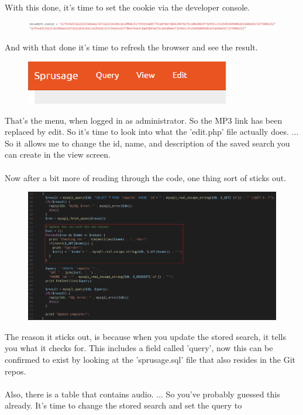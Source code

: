 \documentclass[writeup.tex]{subfiles}
\begin{document}
			With this done, it's time to set the cookie via the developer console.
			
			\begin{figure}[H]
				\centering
				\includegraphics[width=\linewidth]{"screenshots/pwns/Site 7 - cookie"}
			\end{figure}
			
			And with that done it's time to refresh the browser and see the result.
			
			\begin{figure}[H]
				\centering
				\includegraphics[scale=1]{"screenshots/pwns/Site 7 - admin menu"}
			\end{figure}
			
			That's the menu, when logged in as administrator. So the MP3 link has been replaced by edit. So it's time to look into what the 'edit.php' file actually does. ... So it allows me to change the id, name, and description of the saved search you can create in the view screen.\\
			\\
			Now after a bit more of reading through the code, one thing sort of sticks out.
			
			\begin{figure}[H]
				\centering
				\includegraphics[width=\linewidth]{"screenshots/pwns/Site 7 - sql edit"}
			\end{figure}
			
			The reason it sticks out, is because when you update the stored search, it tells you what it checks for. This includes a field called 'query', now this can be confirmed to exist by looking at the 'sprusage.sql' file that also resides in the Git repos.\\
			\\
			Also, there is a table that contains audio. ... So you've probably guessed this already. It's time to change the stored search and set the query to		
			
\end{document}
